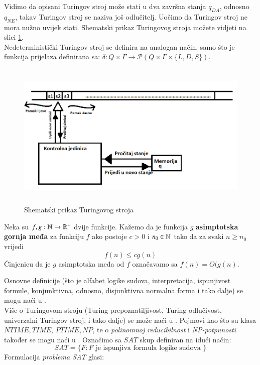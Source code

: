 \documentclass[a4paper,oneside,12pt]{memoir} %
\begin{document}
\begin{spacing}{1.5}
\begin{rem}
Vidimo da opisani Turingov stroj može stati u dva završna stanja $q_{DA}$, odnosno $q_{NE}$, takav Turingov stroj se naziva još odlučitelj. Uočimo da Turingov stroj ne mora nužno uvijek stati. Shematski prikaz Turingovog stroja možete vidjeti na slici \ref{fig:Turing}.\\
Nedeterministički Turingov stroj se definira na analogan način, samo što je funkcija prijelaza definirana sa: $\delta : Q \times \Gamma \to \mathcal{P}(Q \times \Gamma \times \{L,D,S\})$. 
\end{rem}
\begin{figure}[h!t]
\centering \includegraphics[height=200pt, width=400pt]{Turing.png}
\caption{Shematski prikaz Turingovog stroja}
\label{fig:Turing}
\end{figure} 
\begin{defn}
Neka su $f, g: \mathbb{N} \to \mathbb{R}^{+}$ dvije funkcije. Kažemo da je funkcija $g$ \textbf{asimptotska gornja međa} za funkciju $f$ ako postoje $c>0$ i $n_0 \in \mathbb{N}$ tako da za svaki $n \geq n_0$ vrijedi
\[f(n)\leq cg(n)\]
Činjenicu da je $g$ asimptotska međa od $f$ označavamo sa $f(n)=O(g(n)$. 
\end{defn}
Osnovne definicije (što je alfabet logike sudova, interpretacija, ispunjivost formule, konjunktivna, odnosno, disjunktivna normalna forma  i tako dalje) se mogu naći u \cite{Vukovic}.\\
Više o Turingovom stroju (Turing prepoznatiljivost, Turing odlučivost, univerzalni Turingov stroj, i tako dalje) se može naći u \cite{Sipser}. Pojmovi kao što su klasa $NTIME,TIME$, $PTIME,NP$, te o \textit{polinomnoj reducibilnost} i \textit{NP-potpunosti} također se mogu naći u \cite{Sipser}.
Označimo sa $SAT$ skup definiran na idući način:
\[SAT=\{F: F \textrm{ je ispunjiva formula logike sudova }\}\]
Formulacija \textit{problema SAT} glasi:\\
\begin{center}

\end{center}
\end{spacing}
\end{document}
